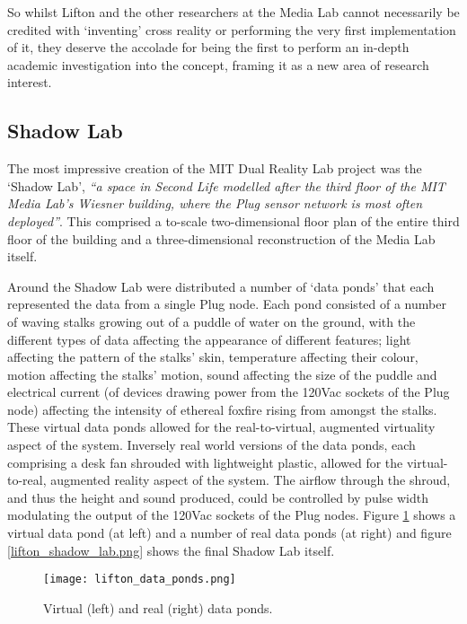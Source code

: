 So whilst Lifton and the other researchers at the Media Lab cannot necessarily be credited with `inventing' cross reality or performing the very first implementation of it, they deserve the accolade for being the first to perform an in-depth academic investigation into the concept, framing it as a new area of research interest.

\subsection{Shadow Lab}
\label{subsec:mit_shadow_lab}
The most impressive creation of the MIT Dual Reality Lab project was the `Shadow Lab', \textit{``a space in Second Life modelled after the third floor of the MIT Media Lab's Wiesner building, where the Plug sensor network is most often deployed''}. This comprised a to-scale two-dimensional floor plan of the entire third floor of the building and a three-dimensional reconstruction of the Media Lab itself.

Around the Shadow Lab were distributed a number of `data ponds' that each represented the data from a single Plug node. Each pond consisted of a number of waving stalks growing out of a puddle of water on the ground, with the different types of data affecting the appearance of different features; light affecting the pattern of the stalks' skin, temperature affecting their colour, motion affecting the stalks' motion, sound affecting the size of the puddle and electrical current (of devices drawing power from the 120Vac sockets of the Plug node) affecting the intensity of ethereal foxfire rising from amongst the stalks. These virtual data ponds allowed for the real-to-virtual, augmented virtuality aspect of the system. Inversely real world versions of the data ponds, each comprising a desk fan shrouded with lightweight plastic, allowed for the virtual-to-real, augmented reality aspect of the system. The airflow through the shroud, and thus the height and sound produced, could be controlled by pulse width modulating the output of the 120Vac sockets of the Plug nodes. Figure \ref{lifton_data_ponds.png} shows a virtual data pond (at left) and a number of real data ponds (at right) and figure \ref{lifton_shadow_lab.png} shows the final Shadow Lab itself.

\begin{figure}[h]
\centering
\texttt{[image: lifton\_data\_ponds.png]}
\caption{Virtual (left) and real (right) data ponds.}
\label{lifton_data_ponds.png}
\end{figure}

